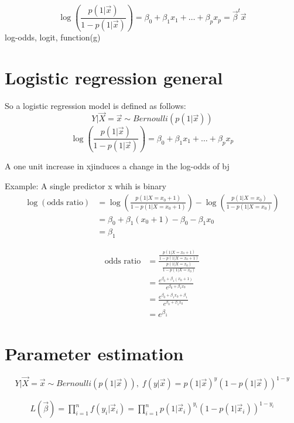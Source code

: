 $$
\log\left(\frac{p(1|\vec{x})}{1 - p(1|\vec{x})}\right) 
= \beta_0 + \beta_1 x_1 + \dots + \beta_px_p 
= \vec{\beta}^t\vec{x}
$$
log-odds, logit, function(g)

\section{Logistic regression general}
So a logistic regression model is defined as follows:
$$Y|\vec{X} = \vec{x} \sim Bernoulli(p(1|\vec{x}))$$
$$\log\left(\frac{p(1|\vec{x})}{1 - p(1|\vec{x})}\right) 
= \beta_0 + \beta_1 x_1 + \dots + \beta_px_p $$

A one unit increase in xjinduces a change in the log-odds of bj

Example: A single predictor x whih is binary
\begin{align*}
\log(\text{odds ratio})
  & = \log\left(\frac{p(1|X=x_0+1)}{1-p(1|X=x_0+1)}\right)-\log\left(\frac{p(1|X=x_0)}{1-p(1|X=x_0)}\right)\\
  & = \beta_0 + \beta_1 (x_0 + 1) - \beta_0 - \beta_1x_0 \\
  & = \beta_1
\end{align*}

\begin{align*}
\text{odds ratio}
  & = \frac{\frac{p(1|X=x_0+1)}{1-p(1|X=x_0+1)}}{\frac{p(1|X=x_0)}{1-p(1|X=x_0)}} \\
  & = \frac{e^{\beta_0 + \beta_1 (x_0 + 1)}}{e^{\beta_0 + \beta_1 x_0}}\\
  & = \frac{e^{\beta_0 + \beta_1x_0 + \beta_1}}{e^{\beta_0 + \beta_1 x_0}} \\
  & = e^{\beta_1}
\end{align*}

\section{Parameter estimation}
$$Y|\vec{X} = \vec{x} \sim Bernoulli(p(1|\vec{x})), \; f(y|\vec{x}) = p(1|\vec{x})^y(1-p(1|\vec{x}))^{1-y}$$

\begin{align*}
L(\vec{\beta}) = \prod_{i=1}^{n}f(y_i|\vec{x}_i) = \prod_{i=1}^{n}p(1|\vec{x}_i)^{y_i}(1-p(1|\vec{x}_i))^{1-y_i}
\end{align*}

